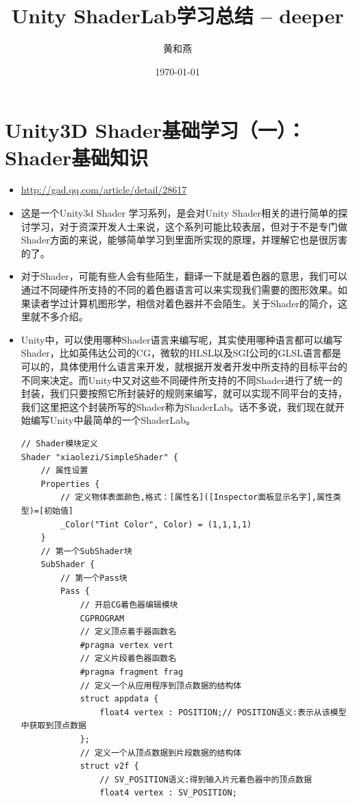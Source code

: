 \documentclass[9pt, b5paper]{article}
\author{黄和燕}
\date{\today}
\title{Unity ShaderLab学习总结 -- deeper}
\begin{document}
\maketitle
\tableofcontents


\section{Unity3D Shader基础学习（一）：Shader基础知识}
\label{sec-1}
\begin{itemize}
\item \url{http://gad.qq.com/article/detail/28617}
\item 这是一个Unity3d Shader 学习系列，是会对Unity Shader相关的进行简单的探讨学习，对于资深开发人士来说，这个系列可能比较表层，但对于不是专门做Shader方面的来说，能够简单学习到里面所实现的原理，并理解它也是很厉害的了。
\item 对于Shader，可能有些人会有些陌生，翻译一下就是着色器的意思，我们可以通过不同硬件所支持的不同的着色器语言可以来实现我们需要的图形效果。如果读者学过计算机图形学，相信对着色器并不会陌生。关于Shader的简介，这里就不多介绍。
\item Unity中，可以使用哪种Shader语言来编写呢，其实使用哪种语言都可以编写Shader，比如英伟达公司的CG，微软的HLSL以及SGI公司的GLSL语言都是可以的，具体使用什么语言来开发，就根据开发者开发中所支持的目标平台的不同来决定。而Unity中又对这些不同硬件所支持的不同Shader进行了统一的封装，我们只要按照它所封装好的规则来编写，就可以实现不同平台的支持，我们这里把这个封装所写的Shader称为ShaderLab。话不多说，我们现在就开始编写Unity中最简单的一个ShaderLab。
\begin{verbatim}
// Shader模块定义  
Shader "xiaolezi/SimpleShader" {
    // 属性设置  
    Properties {
        // 定义物体表面颜色,格式：[属性名]([Inspector面板显示名字],属性类型)=[初始值]  
        _Color("Tint Color", Color) = (1,1,1,1)  
    }  
    // 第一个SubShader块  
    SubShader {  
        // 第一个Pass块  
        Pass {  
            // 开启CG着色器编辑模块  
            CGPROGRAM  
            // 定义顶点着手器函数名  
            #pragma vertex vert  
            // 定义片段着色器函数名  
            #pragma fragment frag  
            // 定义一个从应用程序到顶点数据的结构体  
            struct appdata {  
                float4 vertex : POSITION;// POSITION语义:表示从该模型中获取到顶点数据  
            };  
            // 定义一个从顶点数据到片段数据的结构体  
            struct v2f {  
                // SV_POSITION语义:得到输入片元着色器中的顶点数据  
                float4 vertex : SV_POSITION;

\end{verbatim}
\end{itemize}
\end{document}
